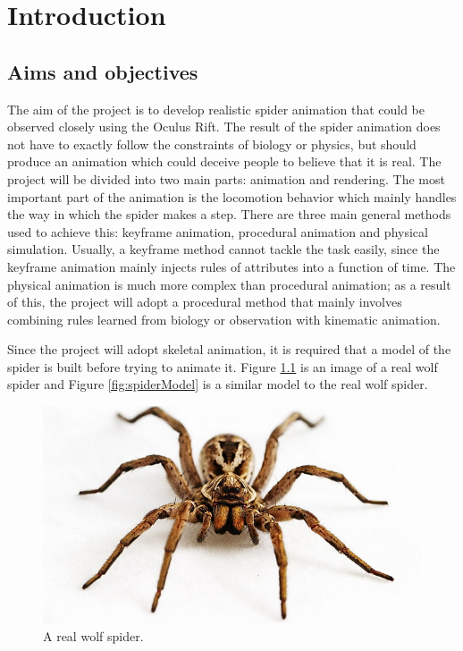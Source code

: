 \chapter{Introduction}
\section{Aims and objectives}
The aim of the project is to develop realistic spider animation that could be observed closely using the Oculus Rift. The result of the spider animation does not have to exactly follow the constraints of biology or physics, but should produce an animation which could deceive people to believe that it is real. 
The project will be divided into two main parts: animation and rendering. 
The most important part of the animation is the locomotion behavior which mainly handles the way in which the spider makes a step. 
There are three main general methods used to achieve this: keyframe animation, procedural animation and physical simulation. Usually, a keyframe method cannot tackle the task easily, since the keyframe animation mainly injects rules of attributes into a function of time. The physical animation is much more complex than procedural animation; as a result of this, the project will adopt a procedural method that mainly involves combining rules learned from biology or observation with kinematic animation.  

Since the project will adopt skeletal animation, it is required that a model of the spider is built before trying to animate it. Figure  \ref{fig:realSpider} is an image of a real wolf spider and Figure \ref{fig:spiderModel} is a similar model to the real wolf spider.


\begin{figure}[ht!]
\centering
\includegraphics[width=14cm]{figures/realSpider.png}
\caption{A real wolf spider. \protect\footnotemark}
\label{fig:realSpider}
\end{figure}

